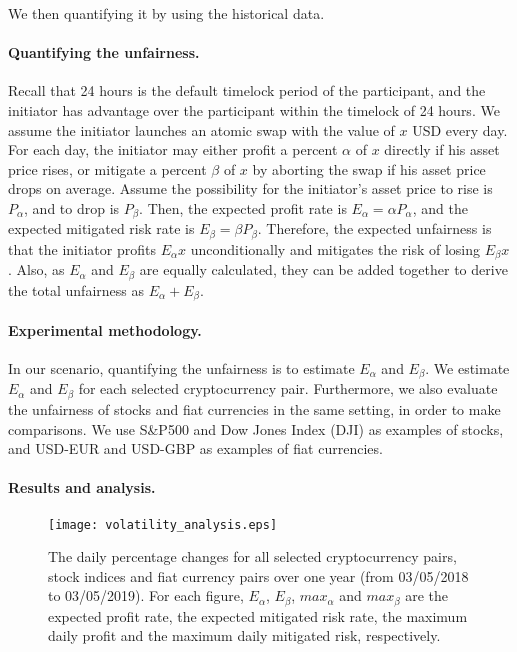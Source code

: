 We then quantifying it by using the historical data.

\paragraph{Quantifying the unfairness.}
Recall that 24 hours is the default timelock period of the participant,
and the initiator has advantage over the participant within the timelock of 24 hours.
We assume the initiator launches an atomic swap with the value of $x$ USD every day.
For each day, the initiator may either profit a percent $\alpha$ of $x$ directly if his asset price rises,
or mitigate a percent $\beta$ of $x$ by aborting the swap if his asset price drops on average.
Assume the possibility for the initiator's asset price to rise is $P_{\alpha}$, and to drop is $P_{\beta}$.
Then, the expected profit rate is $E_{\alpha} = \alpha P_{\alpha}$,
and the expected mitigated risk rate is $E_{\beta} = \beta P_{\beta}$.
Therefore, the expected unfairness is that the initiator profits $E_{\alpha} x$ unconditionally and mitigates the risk of losing $E_{\beta} x$.
Also, as $E_\alpha$ and $E_\beta$ are equally calculated, they can be added together to derive the total unfairness as $E_\alpha + E_\beta$.

\paragraph{Experimental methodology.}
In our scenario, quantifying the unfairness is to estimate $E_{\alpha}$ and $E_{\beta}$.
We estimate $E_{\alpha}$ and $E_{\beta}$ for each selected cryptocurrency pair.
Furthermore,  we also evaluate the unfairness of stocks and fiat currencies in the same setting, in order to make comparisons.
We use S\&P500 and Dow Jones Index (DJI) as examples of stocks, and USD-EUR and USD-GBP as examples of fiat currencies.

\paragraph{Results and analysis.}

\begin{figure*}
    \texttt{[image: volatility\_analysis.eps]}
    \caption{The daily percentage changes for all selected cryptocurrency pairs, stock indices and fiat currency pairs over one year (from 03/05/2018 to 03/05/2019). For each figure, $E_{\alpha}$, $E_{\beta}$, $max_\alpha$ and $max_\beta$ are the expected profit rate, the expected mitigated risk rate, the maximum daily profit and the maximum daily mitigated risk, respectively.}
    \label{fig:volatility_analysis}
\end{figure*}

